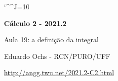 \documentclass[oneside,12pt]{article}
\begin{document}
\catcode`\^^J=10
\pu
\def\pictgridstyle{\color{GrayPale}\linethickness{0.3pt}}
\def\pictaxesstyle{\linethickness{0.5pt}}
\def\pictcurvestyle{\linethickness{0.7pt}}
\def\pictcurvestyle{\linethickness{1.0pt}}

\pu



\def\u#1{\par{\footnotesize \url{#1}}}

\def\drafturl{http://angg.twu.net/LATEX/2021-2-C2.pdf}
\def\drafturl{http://angg.twu.net/2021.2-C2.html}
\def\draftfooter{\tiny \href{\drafturl}{\jobname{}} \ColorBrown{\shorttoday{} \hours}}

\def\Intover     #1#2{\overline {∫}_{#1}#2\,dx}
\def\Intunder    #1#2{\underline{∫}_{#1}#2\,dx}
\def\Intoverunder#1#2{\Intover{#1}{#2} - \Intunder{#1}{#2}}

\def\Intxover     #1#2#3{\overline {∫}_{x=#1}^{x=#2}#3\,dx}
\def\Intxunder    #1#2#3{\underline{∫}_{x=#1}^{x=#2}#3\,dx}

\def\Intoverunder   #1#2{\overline{\underline{∫}}_{#1}      #2\,dx}
\def\Intxoverunder#1#2#3{\overline{\underline{∫}}_{x=#1}^{x=#2} #3\,dx}

\def\sumiN#1{\sum_{i=1}^N #1 (b_i-a_i)}
\def\mname#1{\text{[#1]}}

\def\Io #1{\Intover      {[2,10]_{2^{#1}}} {f(x)}}
\def\Iu #1{\Intunder     {[2,10]_{2^{#1}}} {f(x)}}
\def\Iou#1{\Intoverunder {[2,10]_{2^{#1}}} {f(x)}}
%




%

\thispagestyle{empty}

\begin{center}

\vspace*{1.2cm}

{\bf \Large Cálculo 2 - 2021.2}

\bsk

Aula 19: a definição da integral

\bsk

Eduardo Ochs - RCN/PURO/UFF

\url{http://angg.twu.net/2021.2-C2.html}

\end{center}
\end{document}
